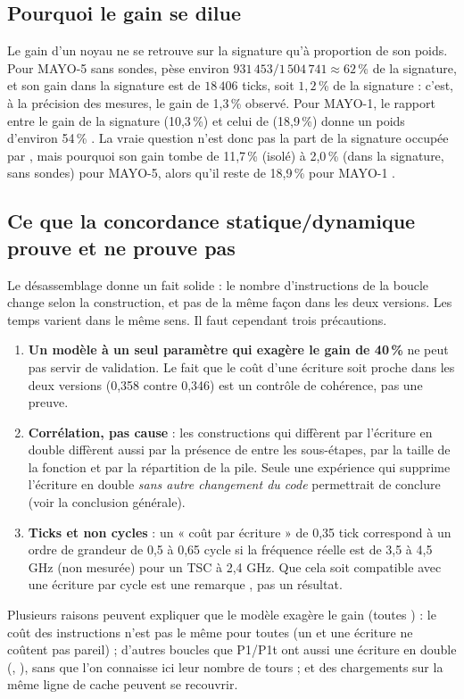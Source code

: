 \subsection{Pourquoi le gain se dilue}
Le gain d'un noyau ne se retrouve sur la signature qu'à proportion de son poids. Pour MAYO-5 sans sondes,  pèse environ $931\,453/1\,504\,741\approx62$\,\% de la signature, et son gain dans la signature est de $18\,406$ ticks, soit $1{,}2$\,\% de la signature : c'est, à la précision des mesures, le gain de 1,3\,\% observé. Pour MAYO-1, le rapport entre le gain de la signature (10,3\,\%) et celui de  (18,9\,\%) donne un poids d'environ 54\,\% \I{}. La vraie question n'est donc pas la part de la signature occupée par , mais pourquoi son gain tombe de 11,7\,\% (isolé) à 2,0\,\% (dans la signature, sans sondes) pour MAYO-5, alors qu'il reste de 18,9\,\% pour MAYO-1 \F{}.

\subsection{Ce que la concordance statique/dynamique prouve et ne prouve pas}
Le désassemblage donne un fait solide : le nombre d'instructions de la boucle change selon la construction, et pas de la même façon dans les deux versions. Les temps varient dans le même sens. Il faut cependant trois précautions.
\begin{enumerate}
\item \textbf{Un modèle à un seul paramètre qui exagère le gain de 40\,\%} ne peut pas servir de validation. Le fait que le coût d'une écriture soit proche dans les deux versions (0,358 contre 0,346) est un contrôle de cohérence, pas une preuve.
\item \textbf{Corrélation, pas cause} : les constructions qui diffèrent par l'écriture en double diffèrent aussi par la présence de  entre les sous-étapes, par la taille de la fonction et par la répartition de la pile. Seule une expérience qui supprime l'écriture en double \emph{sans autre changement du code} permettrait de conclure (voir la conclusion générale).
\item \textbf{Ticks et non cycles} : un « coût par écriture » de 0,35 tick correspond à un ordre de grandeur de 0,5 à 0,65 cycle si la fréquence réelle est de 3,5 à 4,5 GHz (non mesurée) pour un TSC à 2,4 GHz. Que cela soit compatible avec une écriture par cycle est une remarque \Hy{}, pas un résultat.
\end{enumerate}
Plusieurs raisons peuvent expliquer que le modèle exagère le gain (toutes \Hy{}) : le coût des instructions n'est pas le même pour toutes (un  et une écriture ne coûtent pas pareil) ; d'autres boucles que P1/P1t ont aussi une écriture en double (, ), sans que l'on connaisse ici leur nombre de tours ; et des chargements sur la même ligne de cache peuvent se recouvrir.

